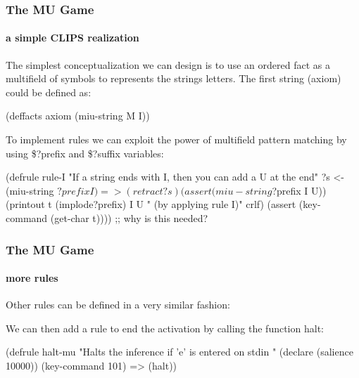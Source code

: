 \documentclass[xcolor={usenames,dvipsnames,svgnames}, compress]{beamer}
\begin{document}
\begin{frame}[fragile]
  \frametitle{The MU Game}
  \framesubtitle{a simple CLIPS realization}

  The simplest conceptualization we can design is to use an ordered
  fact as a multifield of symbols to represents the strings
  letters. The first string (axiom) could be defined as:
  
  \begin{clips-code}[numbers=none]
    (deffacts axiom
        (miu-string M I))
  \end{clips-code}

  To implement rules we can exploit the power of multifield pattern
  matching by using \textsf{\$?prefix} and \textsf{\$?suffix} variables:
  \begin{clips-code}[numbers=none]
    (defrule rule-I
        "If a string ends with I, then you can add a U at the end"
        ?s <- (miu-string $?prefix I)
        =>
        (retract ?s)
        (assert (miu-string $?prefix I U))
        (printout t (implode$ $?prefix) I U " (by applying rule I)" crlf)
        (assert (key-command (get-char t)))) ;; why is this needed?
  \end{clips-code}


\end{frame}

\begin{frame}[fragile]
  \frametitle{The MU Game}
  \framesubtitle{more rules}
  Other rules can be defined in a very similar fashion:

  We can then add a rule to end the activation by calling the function
  \textsf{halt}:
  \begin{clips-code}[numbers=none]
    (defrule halt-mu
        "Halts the inference if 'e' is entered on stdin "
        (declare (salience 10000))
        (key-command 101)
        =>
        (halt))
  \end{clips-code}
      
\end{frame}
\end{document}
